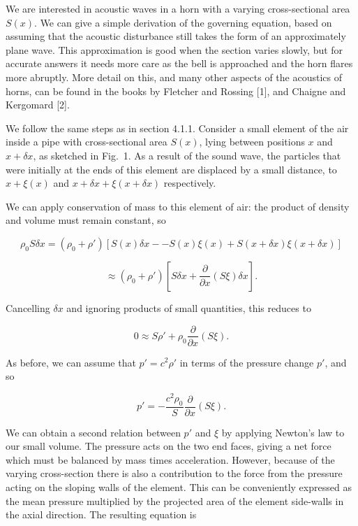   We are interested in acoustic waves in a horn with a varying cross-sectional 
  area $S(x)$. We can give a simple derivation of the governing equation, based 
  on assuming that the acoustic disturbance still takes the form of an 
  approximately plane wave. This approximation is good when the section varies 
  slowly, but for accurate answers it needs more care as the bell is approached 
  and the horn flares more abruptly. More detail on this, and many other 
  aspects of the acoustics of horns, can be found in the books by Fletcher and 
  Rossing [1], and Chaigne and Kergomard [2]. 

  We follow the same steps as in section 4.1.1. Consider a small element of the 
  air inside a pipe with cross-sectional area $S(x)$, lying between positions 
  $x$ and $x+\delta x$, as sketched in Fig.\ 1. As a result of the sound wave, 
  the particles that were initially at the ends of this element are displaced 
  by a small distance, to $x+\xi(x)$ and $x + \delta x + \xi(x + \delta x)$ 
  respectively. 

  We can apply conservation of mass to this element of air: the product of 
  density and volume must remain constant, so 

  $$\rho_0 S \delta x = (\rho_0 + \rho') \left[ S(x) \delta x -- S(x) \xi(x) 
  +S(x+ \delta x) \xi(x+ \delta x) \right] $$ 

  $$\approx (\rho_0 + \rho') \left[ S \delta x + \frac{\partial}{\partial x} 
  \left(S \xi \right) \delta x \right] . \tag{1}$$ 

  Cancelling $\delta x$ and ignoring products of small quantities, this reduces 
  to 

  $$0 \approx S \rho' + \rho_0 \frac{\partial}{\partial x} \left(S \xi \right) 
  . \tag{2}$$ 

  As before, we can assume that $p' = c^2 \rho'$ in terms of the pressure 
  change $p'$, and so 

  $$p' = -\dfrac{c^2 \rho_0}{S}\frac{\partial}{\partial x} \left(S \xi \right) 
  . \tag{3}$$ 

  We can obtain a second relation between $p'$ and $\xi$ by applying Newton's 
  law to our small volume. The pressure acts on the two end faces, giving a net 
  force which must be balanced by mass times acceleration. However, because of 
  the varying cross-section there is also a contribution to the force from the 
  pressure acting on the sloping walls of the element. This can be conveniently 
  expressed as the mean pressure multiplied by the projected area of the 
  element side-walls in the axial direction. The resulting equation is 

